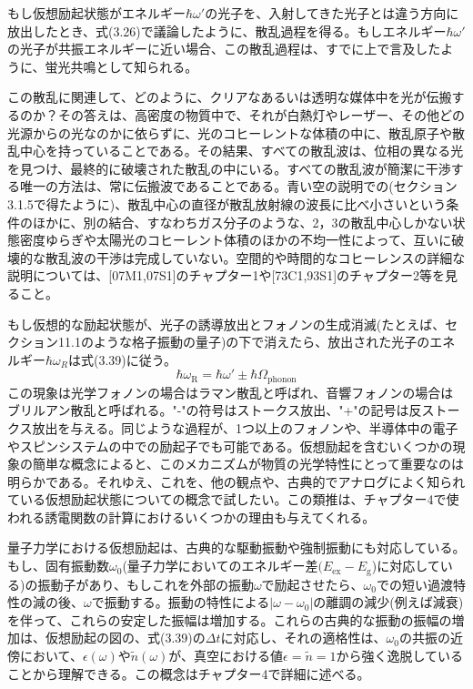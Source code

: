 \documentclass[11pt,a4j,uplatex]{jsarticle}
\begin{document}
もし仮想励起状態がエネルギー$\hbar\omega'$の光子を、入射してきた光子とは違う方向に放出したとき、式(3.26)で議論したように、散乱過程を得る。もしエネルギー$\hbar\omega'$の光子が共振エネルギーに近い場合、この散乱過程は、すでに上で言及したように、蛍光共鳴として知られる。

この散乱に関連して、どのように、クリアなあるいは透明な媒体中を光が伝搬するのか？その答えは、高密度の物質中で、それが白熱灯やレーザー、その他どの光源からの光なのかに依らずに、光のコヒーレントな体積の中に、散乱原子や散乱中心を持っていることである。その結果、すべての散乱波は、位相の異なる光を見つけ、最終的に破壊された散乱の中にいる。すべての散乱波が簡潔に干渉する唯一の方法は、常に伝搬波であることである。青い空の説明での(セクション3.1.5で得たように)、散乱中心の直径が散乱放射線の波長に比べ小さいという条件のほかに、別の結合、すなわちガス分子のような、2，3の散乱中心しかない状態密度ゆらぎや太陽光のコヒーレント体積のほかの不均一性によって、互いに破壊的な散乱波の干渉は完成していない。空間的や時間的なコヒーレンスの詳細な説明については、[07M1,07S1]のチャプター1や[73C1,93S1]のチャプター2等を見ること。%

もし仮想的な励起状態が、光子の誘導放出とフォノンの生成消滅(たとえば、セクション11.1のような格子振動の量子)の下で消えたら、放出された光子のエネルギー$\hbar\omega_R$は式(3.39)に従う。
\begin{equation}
  \hbar\omega_{\mathrm{R}}=\hbar\omega'\pm\hbar\Omega_{\mathrm{phonon}}\tag{3.39}
\end{equation}
この現象は光学フォノンの場合はラマン散乱と呼ばれ、音響フォノンの場合はブリルアン散乱と呼ばれる。"-"の符号はストークス放出、"+"の記号は反ストークス放出を与える。同じような過程が、1つ以上のフォノンや、半導体中の電子やスピンシステムの中での励起子でも可能である。仮想励起を含むいくつかの現象の簡単な概念によると、このメカニズムが物質の光学特性にとって重要なのは明らかである。それゆえ、これを、他の観点や、古典的でアナログによく知られている仮想励起状態についての概念で試したい。この類推は、チャプター4で使われる誘電関数の計算におけるいくつかの理由も与えてくれる。

量子力学における仮想励起は、古典的な駆動振動や強制振動にも対応している。もし、固有振動数$\omega_0$(量子力学においてのエネルギー差$(E_{\mathrm{ex}}-E_{\mathrm{g}}$)に対応している)の振動子があり、もしこれを外部の振動$\omega$で励起させたら、$\omega_0$での短い過渡特性の減の後、$\omega$で振動する。振動の特性による$\left|\omega-\omega_0\right|$の離調の減少(例えば減衰)を伴って、これらの安定した振幅は増加する。これらの古典的な振動の振幅の増加は、仮想励起の図の、式(3.39)の$\Delta t$に対応し、それの適格性は、$\omega_0$の共振の近傍において、$\epsilon(\omega)$や$\tilde{n}(\omega)$が、真空における値$\epsilon=\tilde{n}=1$から強く逸脱していることから理解できる。この概念はチャプター4で詳細に述べる。
\end{document}
